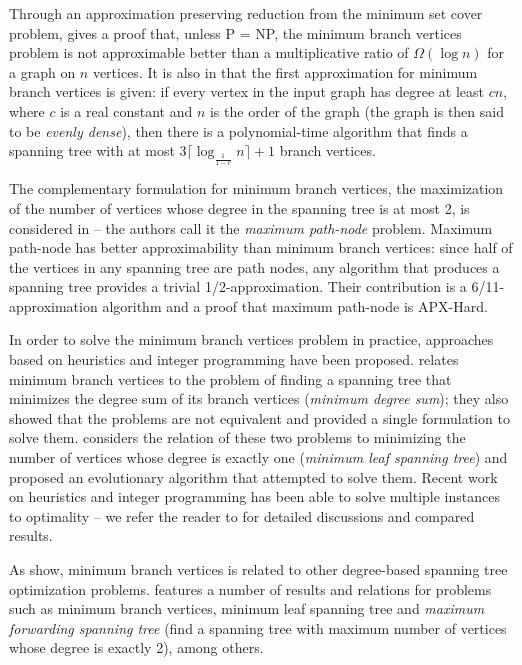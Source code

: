 \documentclass[12pt]{article}
\begin{document}
Through an approximation preserving reduction from the minimum set cover problem, \cite{salamon2010} gives a proof that, unless P = NP, the minimum branch vertices problem is not approximable better than a multiplicative ratio of $\Omega(\log n)$ for a graph on $n$ vertices.
It is also in \cite{salamon2010} that the first approximation for minimum branch vertices is given: if every vertex in the input graph has degree at least $cn$, where $c$ is a real constant and $n$ is the order of the graph (the graph is then said to be \emph{evenly dense}), then there is a polynomial-time algorithm that finds a spanning tree with at most $3\lceil \log_{\frac{1}{1 - c}}n\rceil + 1$ branch vertices. 

The complementary formulation for minimum branch vertices, the maximization of the number of vertices whose degree in the spanning tree is at most 2, is considered in \cite{chimani2015} -- the authors call it the \emph{maximum path-node} problem. 
Maximum path-node has better approximability than minimum branch vertices: since half of the vertices in any spanning tree are path nodes, any algorithm that produces a spanning tree provides a trivial 1/2-approximation.
Their contribution is a 6/11-approximation algorithm and a proof that maximum path-node is APX-Hard.

In order to solve the minimum branch vertices problem in practice, approaches based on heuristics and integer programming have been proposed.
\cite{cerulli2009} relates minimum branch vertices to the problem of finding a spanning tree that minimizes the degree sum of its branch vertices (\emph{minimum degree sum}); they also showed that the problems are not equivalent and provided a single formulation to solve them.
\cite{cerrone2014} considers the relation of these two problems to minimizing the number of vertices whose degree is exactly one (\emph{minimum leaf spanning tree}) and proposed an evolutionary algorithm that attempted to solve them.
Recent work on heuristics and integer programming has been able to solve multiple instances to optimality -- we refer the reader to \cite{marin2015, melo2016, silvestri2017} for detailed discussions and compared results.

As \cite{cerulli2009, cerrone2014} show, minimum branch vertices is related to other degree-based spanning tree optimization problems.
\cite{salamon2010} features a number of results and relations for problems such as minimum branch vertices, minimum leaf spanning tree and \emph{maximum forwarding spanning tree} (find a spanning tree with maximum number of vertices whose degree is exactly 2), among others.
\end{document}
